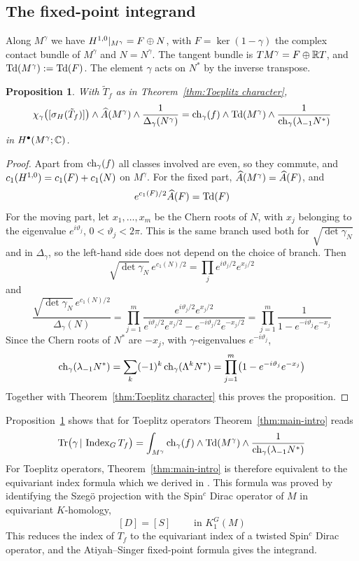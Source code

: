 \documentclass[11pt]{amsart}
\theoremstyle{plain}
\newtheorem{proposition}[theorem]{Proposition}
\theoremstyle{definition}
\theoremstyle{remark}
\begin{document}
\subsection{The fixed-point integrand}\label{sec:Toeplitz integrand}

Along $M^\gamma$ we have $H^{1,0}|_{M^\gamma}=F\oplus N$, with $F=\ker(1-\gamma)$ the complex contact bundle of $M^\gamma$ and $N=N^\gamma$.
The tangent bundle is $TM^\gamma=F\oplus{\mathbb{R}}T$, and $\operatorname{Td}(M^\gamma):=\operatorname{Td}(F)$.
The element $\gamma$ acts on $N^*$ by the inverse transpose.

\begin{proposition}\label{prop:Toeplitz integrand}
With $\tilde T_f$ as in Theorem~\ref{thm:Toeplitz character},
\[ \chi_\gamma\bigl([\sigma_H(\tilde T_f)]\bigr)\wedge\widehat{A}(M^\gamma)\wedge\frac{1}{\Delta_\gamma(N^\gamma)}=\operatorname{ch}_\gamma(f)\wedge\operatorname{Td}(M^\gamma)\wedge\frac{1}{\operatorname{ch}_\gamma(\lambda_{-1}N^*)}\]
in $H^\bullet(M^\gamma;{\mathbb{C}})$.
\end{proposition}
\begin{proof}
Apart from $\operatorname{ch}_\gamma(f)$ all classes involved are even, so they commute, and $c_1(H^{1,0})=c_1(F)+c_1(N)$ on $M^\gamma$.
For the fixed part, $\widehat{A}(M^\gamma)=\widehat{A}(F)$, and 
\[e^{c_1(F)/2}\widehat{A}(F)=\operatorname{Td}(F)\]
For the moving part, let $x_1,\dots,x_m$ be the Chern roots of $N$, with $x_j$ belonging to the eigenvalue $e^{i\vartheta_j}$, $0<\vartheta_j<2\pi$.
This is the same branch used both for $\sqrt{\det\gamma_N}$ and in $\Delta_\gamma$, so the left-hand side does not depend on the choice of branch.
Then 
\[\sqrt{\det\gamma_N}\,e^{c_1(N)/2}=\prod_je^{i\vartheta_j/2}e^{x_j/2}\]
and
\[ \frac{\sqrt{\det\gamma_N}\,e^{c_1(N)/2}}{\Delta_\gamma(N)}=\prod_{j=1}^m\frac{e^{i\vartheta_j/2}e^{x_j/2}}{e^{i\vartheta_j/2}e^{x_j/2}-e^{-i\vartheta_j/2}e^{-x_j/2}}=\prod_{j=1}^m\frac{1}{1-e^{-i\vartheta_j}e^{-x_j}}\]
Since the Chern roots of $N^*$ are $-x_j$, with $\gamma$-eigenvalues $e^{-i\vartheta_j}$,
\[ \operatorname{ch}_\gamma(\lambda_{-1}N^*)=\sum_k(-1)^k\operatorname{ch}_\gamma(\Lambda^kN^*)=\prod_{j=1}^m\bigl(1-e^{-i\vartheta_j}e^{-x_j}\bigr)\]
Together with Theorem~\ref{thm:Toeplitz character} this proves the proposition.

\end{proof}

Proposition~\ref{prop:Toeplitz integrand} shows that for Toeplitz operators Theorem~\ref{thm:main-intro} reads
\[ \operatorname{Tr}\bigl(\gamma\,|\,\operatorname{Index}_GT_f\bigr)=\int_{M^\gamma}\operatorname{ch}_\gamma(f)\wedge\operatorname{Td}(M^\gamma)\wedge\frac{1}{\operatorname{ch}_\gamma(\lambda_{-1}N^*)}\]
For Toeplitz operators, Theorem~\ref{thm:main-intro} is therefore equivalent to the equivariant index formula which we derived in \cite[Theorem~2]{GvE26}.
This formula was proved by identifying 
the Szeg\"o projection with the Spin$^c$ Dirac operator of $M$ in equivariant $K$-homology, 
\[[D]=[S]\qquad \text{ in } K_1^G(M)\]
This  reduces the index of $T_f$ to the equivariant index of a twisted Spin$^c$ Dirac operator, and the Atiyah--Singer fixed-point formula gives the integrand.
\end{document}

